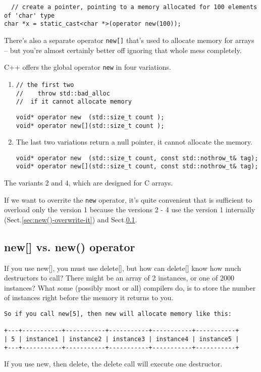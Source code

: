 \begin{verbatim}
  // create a pointer, pointing to a memory allocated for 100 elements of 'char' type
char *x = static_cast<char *>(operator new(100));
\end{verbatim}

There's also a separate operator \verb!new[]! that's used to allocate memory for arrays
-- but you're almost certainly better off ignoring that whole mess completely.




C++ offers the global operator \verb!new! in four variations.
\begin{enumerate}
  \item 

\begin{verbatim}
// the first two 
//    throw std::bad_alloc
//  if it cannot allocate memory
\end{verbatim}
\begin{lstlisting}
void* operator new  (std::size_t count );
void* operator new[](std::size_t count );

\end{lstlisting}

   \item 

The last two variations return a null pointer, it cannot allocate the memory.
   
\begin{lstlisting}
void* operator new  (std::size_t count, const std::nothrow_t& tag);
void* operator new[](std::size_t count, const std::nothrow_t& tag);

\end{lstlisting}

\end{enumerate}
The variants 2 and 4, which are designed for C arrays.

If we want to overrite the \verb!new! operator, it's quite convenient that is
sufficient to overload only the version 1 because the versions 2 - 4 use the
version 1 internally (Sect.\ref{sec:new()-overwrite-it}) and Sect.\ref{sec:new[]-operator}.


\subsection{new[]  vs. new() operator}
\label{sec:new[]-operator}

If you use new[], you must use delete[], but how can delete[] know how much
destructors to call? There might be an array of 2 instances, or one of 2000
instances? What some (possibly most or all) compilers do, is to store the number
of instances right before the memory it returns to you.
\begin{verbatim}
So if you call new[5], then new will allocate memory like this:

+---+-----------+-----------+-----------+-----------+-----------+
| 5 | instance1 | instance2 | instance3 | instance4 | instance5 |
+---+-----------+-----------+-----------+-----------+-----------+
\end{verbatim}
If you use new, then delete, the delete call will execute one destructor.

